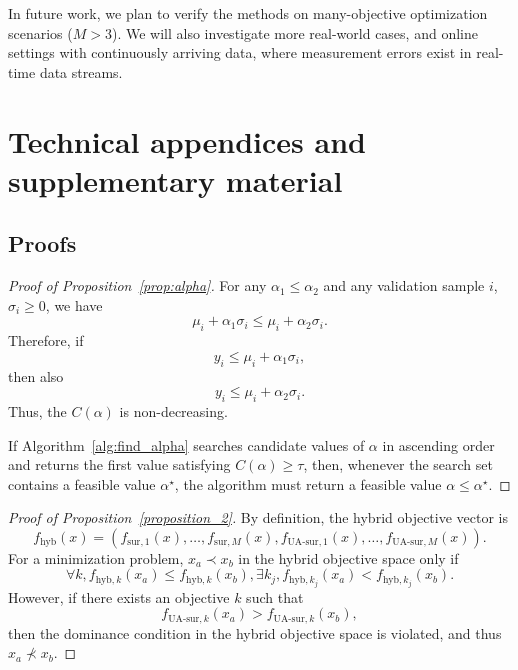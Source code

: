 \documentclass{article}
\begin{document}
In future work, we plan to verify the methods on many-objective optimization scenarios ($M > 3$). We will also investigate more real-world cases, and online settings with continuously arriving data, where measurement errors exist in real-time data streams.







\appendix

\section{Technical appendices and supplementary material}

\subsection{Proofs}

\begin{proof}[Proof of Proposition~\ref{prop:alpha}]
For any $\alpha_1 \le \alpha_2$ and any validation sample $i$, $\sigma_i \ge 0$, we have
\[
\mu_i + \alpha_1 \sigma_i \le \mu_i + \alpha_2 \sigma_i .
\]
Therefore, if 
\[
y_i \le \mu_i + \alpha_1 \sigma_i,
\]
then also
\[
y_i \le \mu_i + \alpha_2 \sigma_i.
\]
Thus, the $C(\alpha)$ is non-decreasing.

If Algorithm~\ref{alg:find_alpha} searches candidate values of $\alpha$ in 
ascending order and returns the first value satisfying $C(\alpha)\ge \tau$, 
then, whenever the search set contains a feasible value $\alpha^\star$, the 
algorithm must return a feasible value $\alpha \le \alpha^\star$.
\end{proof}

\begin{proof}[Proof of Proposition~\ref{proposition_2}]
By definition, the hybrid objective vector is
\[
f_{\mathrm{hyb}}(x)
=
\left(
f_{\mathrm{sur},1}(x),\ldots,f_{\mathrm{sur},M}(x),
f_{\mathrm{UA\text{-}sur},1}(x),\ldots,f_{\mathrm{UA\text{-}sur},M}(x)
\right).
\]
For a minimization problem, $x_a \prec x_b$ in the hybrid objective space only if 
\[
\forall k, f_{\text{hyb},k}(x_a) \le f_{\text{hyb},k}(x_b), 
\exists k_j, f_{\text{hyb},k_j}(x_a) < f_{\text{hyb},k_j}(x_b).
\]
However, if there exists an objective $k$ such that
\[
f_{\mathrm{UA\text{-}sur},k}(x_a)
>
f_{\mathrm{UA\text{-}sur},k}(x_b),
\]
then the dominance condition in the hybrid objective space is violated,
and thus $x_a \not\prec x_b$.
\end{proof}
\end{document}
